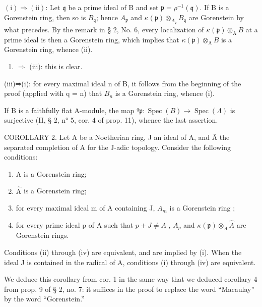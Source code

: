 \((\mathrm{i}) \Rightarrow (\mathrm{ii})\): Let \(\mathfrak{q}\) be a prime ideal of B and set \(\mathfrak{p} = \rho^{-1}(\mathfrak{q})\). If B is a Gorenstein ring, then so is \(B_{\mathfrak{q}}\); hence \(A_{\mathfrak{p}}\) and \(\kappa(\mathfrak{p}) \otimes_{A_{\mathfrak{p}}} B_{\mathfrak{q}}\) are Gorenstein by what precedes. By the remark in § 2, No. 6, every localization of \(\kappa(\mathfrak{p}) \otimes_{\mathrm{A}} B\) at a prime ideal is then a Gorenstein ring, which implies that \(\kappa(\mathfrak{p}) \otimes_{\mathrm{A}} B\) is a Gorenstein ring, whence (ii).

\begin{enumerate}
\def\labelenumi{(\roman{enumi})}
\setcounter{enumi}{1}
\tightlist
\item
  \(\Rightarrow\) (iii): this is clear.
\end{enumerate}

(iii)⇒(i): for every maximal ideal n of B, it follows from the beginning of the proof (applied with q = n) that \(B_{n}\) is a Gorenstein ring, whence (i).

If B is a faithfully flat A-module, the map \(^{q}\mathfrak{p}:\operatorname{Spec}(B)\longrightarrow\operatorname{Spec}(\Lambda)\) is surjective (II, § 2, n° 5, cor. 4 of prop. 11), whence the last assertion.

COROLLARY 2. Let A be a Noetherian ring, J an ideal of A, and Â the separated completion of A for the J-adic topology. Consider the following conditions:

\begin{enumerate}
\def\labelenumi{(\roman{enumi})}
\item
  A is a Gorenstein ring;
\item
  \(\widehat{\mathrm{A}}\) is a Gorenstein ring;
\item
  for every maximal ideal m of A containing J, \(A_{m}\) is a Gorenstein ring ;
\item
  for every prime ideal p of A such that \(p + J \neq A\) , \(A_{p}\) and \(\kappa(\mathfrak{p}) \otimes_{A} \widehat{A}\) are Gorenstein rings.
\end{enumerate}

Conditions (ii) through (iv) are equivalent, and are implied by (i). When the ideal J is contained in the radical of A, conditions (i) through (iv) are equivalent.

We deduce this corollary from cor. 1 in the same way that we deduced corollary 4 from prop. 9 of § 2, no. 7: it suffices in the proof to replace the word “Macaulay” by the word “Gorenstein.”

